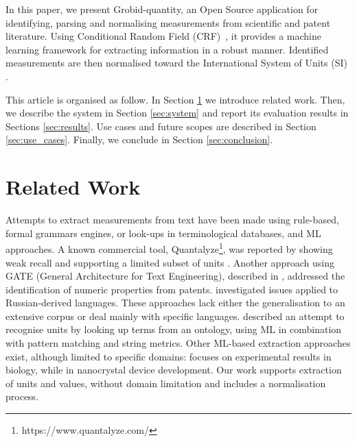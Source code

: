 \documentclass[sigconf]{acmart}
\begin{document}
In this paper, we present Grobid-quantity, an Open Source application \cite{grobid-quantities} for identifying, parsing and normalising measurements from scientific and patent literature. Using Conditional Random Field (CRF)~\cite{lafferty2001conditional}, it provides a machine learning framework for extracting information in a robust manner. Identified measurements are then normalised toward the International System of Units (SI) \cite{internationalSystemOfUnits}. 

This article is organised as follow. In Section \ref{sec:related_work} we introduce related work. Then, we describe the system in Section \ref{sec:system} and report its evaluation results in Sections \ref{sec:results}. Use cases and future scopes are described in Section \ref{sec:use_cases}. Finally, we conclude in Section \ref{sec:conclusion}.

\section{Related Work}
\label{sec:related_work}
Attempts to extract measurements from text have been made using rule-based, formal grammars engines, or look-ups in terminological databases, and ML approaches. A known commercial tool, Quantalyze\footnote{https://www.quantalyze.com/}, was reported by \cite{hundman2017measurement} showing weak recall and supporting a limited subset of units \cite{aras2014applications}. Another approach using GATE (General Architecture for Text Engineering), described in \cite{agatonovic2008large}, addressed the identification of numeric properties from patents. \cite{am2013processing} investigated issues applied to Russian-derived languages. These approaches lack either the generalisation to an extensive corpus or deal mainly with specific languages. \cite{berrahou2013extract} described an attempt to recognise units by looking up terms from an ontology, using ML in combination with pattern matching and string metrics. Other ML-based extraction approaches exist, although limited to specific domains: \cite{kang_extracting_2013} focuses on experimental results in biology, while \cite{dieb2015framework} in nanocrystal device development. Our work supports extraction of units and values, without domain limitation and includes a normalisation process. 
\end{document}
